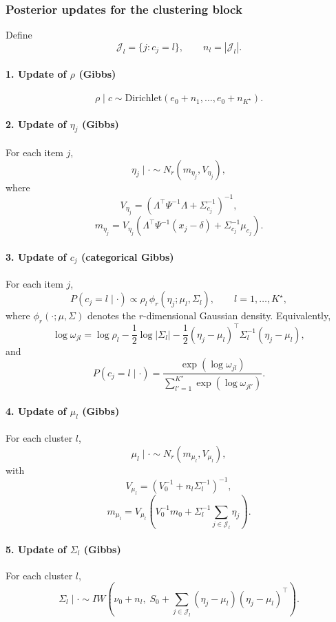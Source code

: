 \subsubsection{Posterior updates for the clustering block}

Define
\[
\mathcal{J}_l = \{j : c_j=l\},
\qquad
n_l = |\mathcal{J}_l|.
\]

\paragraph{1. Update of $\rho$ (Gibbs)}
\[
\rho \mid c
\sim
\mathrm{Dirichlet}(e_0+n_1,\dots,e_0+n_{K^\star}).
\]

\paragraph{2. Update of $\eta_j$ (Gibbs)}
For each item $j$,
\[
\eta_j \mid \cdot
\sim
N_r(m_{\eta_j},V_{\eta_j}),
\]
where
\[
V_{\eta_j}
=
\left(
\Lambda^\top \Psi^{-1}\Lambda + \Sigma_{c_j}^{-1}
\right)^{-1},
\]
\[
m_{\eta_j}
=
V_{\eta_j}
\left(
\Lambda^\top \Psi^{-1}(x_j-\delta)
+
\Sigma_{c_j}^{-1}\mu_{c_j}
\right).
\]

\paragraph{3. Update of $c_j$ (categorical Gibbs)}
For each item $j$,
\[
P(c_j=l \mid \cdot)
\propto
\rho_l \,
\phi_r(\eta_j;\mu_l,\Sigma_l),
\qquad
l=1,\dots,K^\star,
\]
where $\phi_r(\cdot;\mu,\Sigma)$ denotes the $r$-dimensional Gaussian density.
Equivalently,
\[
\log \omega_{jl}
=
\log \rho_l
-
\frac{1}{2}\log |\Sigma_l|
-
\frac{1}{2}(\eta_j-\mu_l)^\top \Sigma_l^{-1}(\eta_j-\mu_l),
\]
and
\[
P(c_j=l \mid \cdot)
=
\frac{\exp(\log \omega_{jl})}
{\sum_{l'=1}^{K^\star}\exp(\log \omega_{jl'})}.
\]

\paragraph{4. Update of $\mu_l$ (Gibbs)}
For each cluster $l$,
\[
\mu_l \mid \cdot
\sim
N_r(m_{\mu_l},V_{\mu_l}),
\]
with
\[
V_{\mu_l}
=
\left(
V_0^{-1} + n_l \Sigma_l^{-1}
\right)^{-1},
\]
\[
m_{\mu_l}
=
V_{\mu_l}
\left(
V_0^{-1}m_0 + \Sigma_l^{-1}\sum_{j\in\mathcal{J}_l}\eta_j
\right).
\]

\paragraph{5. Update of $\Sigma_l$ (Gibbs)}
For each cluster $l$,
\[
\Sigma_l \mid \cdot
\sim
IW\left(
\nu_0+n_l,\;
S_0 + \sum_{j\in\mathcal{J}_l}(\eta_j-\mu_l)(\eta_j-\mu_l)^\top
\right).
\]

